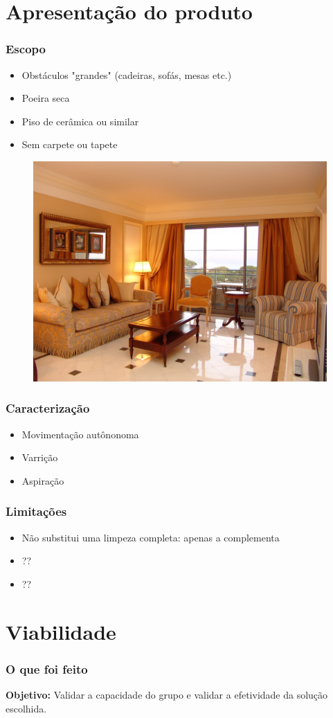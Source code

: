 \documentclass{beamer}
\begin{document}
\section{Apresentação do produto}
\begin{frame}
  \frametitle{Escopo}
  \begin{itemize}
  	\item Obstáculos "grandes" (cadeiras, sofás, mesas etc.)
  	\item Poeira seca
  	\item Piso de cerâmica ou similar
  	\item Sem carpete ou tapete
  \end{itemize}
  
  \begin{figure}
    \includegraphics[width=.30\textwidth]{images/sala.jpg}
  \end{figure}
  
\end{frame}

\begin{frame}
  \frametitle{Caracterização}
  \begin{itemize}
  	\item Movimentação autônonoma
  	\item Varrição
  	\item Aspiração
  \end{itemize}
\end{frame}

\begin{frame}
  \frametitle{Limitações}
  \begin{itemize}
  	\item Não substitui uma limpeza completa: apenas a complementa
  	\item ??
  	\item ??
  \end{itemize}
\end{frame}

\section{Viabilidade}
\begin{frame}
  \frametitle{O que foi feito}
  \textbf{Objetivo:} Validar a capacidade do grupo e validar a efetividade da solução escolhida.
\end{frame}
\end{document}
